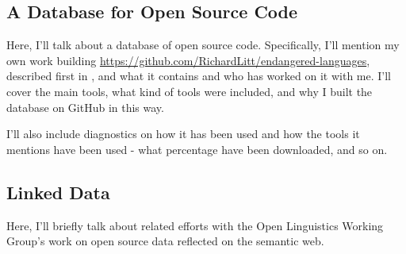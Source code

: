 

\subsection{A Database for Open Source Code}\label{sec:solutions}

Here, I'll talk about a database of open source code. Specifically, I'll mention my own work building \href{https://github.com/RichardLitt/endangered-languages}{https://github.com/RichardLitt/endangered-languages}, described first in \citet{CCURL}, and what it contains and who has worked on it with me. I'll cover the main tools, what kind of tools were included, and why I built the database on GitHub in this way.

I'll also include diagnostics on how it has been used and how the tools it mentions have been used - what percentage have been downloaded, and so on.

\subsection{Linked Data}

Here, I'll briefly talk about related efforts with the Open Linguistics Working Group's \citep{chiarcos2012open} work on open source data reflected on the semantic web.\citep{chiarcos2013building}



%


